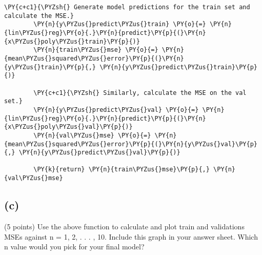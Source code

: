\documentclass[a4paper,11pt]{article}%
\begin{document}
\begin{tcolorbox}[breakable, size=fbox, boxrule=1pt, pad at break*=1mm,colback=cellbackground, colframe=cellborder]
\begin{Verbatim}[commandchars=\\\{\}]
		\PY{c+c1}{\PYZsh{} Generate model predictions for the train set and calculate the MSE.}
		\PY{n}{y\PYZus{}predict\PYZus{}train} \PY{o}{=} \PY{n}{lin\PYZus{}reg}\PY{o}{.}\PY{n}{predict}\PY{p}{(}\PY{n}{x\PYZus{}poly\PYZus{}train}\PY{p}{)}
		\PY{n}{train\PYZus{}mse} \PY{o}{=} \PY{n}{mean\PYZus{}squared\PYZus{}error}\PY{p}{(}\PY{n}{y\PYZus{}train}\PY{p}{,} \PY{n}{y\PYZus{}predict\PYZus{}train}\PY{p}{)}
		
		\PY{c+c1}{\PYZsh{} Similarly, calculate the MSE on the val set.}
		\PY{n}{y\PYZus{}predict\PYZus{}val} \PY{o}{=} \PY{n}{lin\PYZus{}reg}\PY{o}{.}\PY{n}{predict}\PY{p}{(}\PY{n}{x\PYZus{}poly\PYZus{}val}\PY{p}{)}
		\PY{n}{val\PYZus{}mse} \PY{o}{=} \PY{n}{mean\PYZus{}squared\PYZus{}error}\PY{p}{(}\PY{n}{y\PYZus{}val}\PY{p}{,} \PY{n}{y\PYZus{}predict\PYZus{}val}\PY{p}{)}
		
		\PY{k}{return} \PY{n}{train\PYZus{}mse}\PY{p}{,} \PY{n}{val\PYZus{}mse}
	\end{Verbatim}
\end{tcolorbox}

\hypertarget{c}{%
	\subsection{(c)}\label{c}}

(5 points) Use the above function to calculate and plot train and
validations MSEs against n = 1, 2, . . . , 10. Include this graph in
your answer sheet. Which n value would you pick for your final model?
\end{document}
